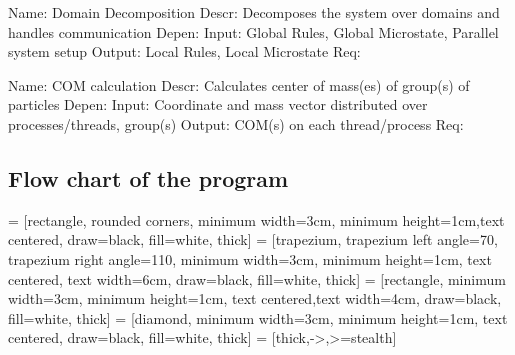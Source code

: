 Name:    Domain Decomposition
Descr:   Decomposes the system over domains and handles communication
Depen:  
Input:   Global Rules, Global Microstate, Parallel system setup
Output:  Local Rules, Local Microstate
Req:    
 
Name:  COM calculation
Descr:  Calculates center of mass(es) of group(s) of particles
Depen:
Input:  Coordinate and mass vector distributed over processes/threads, group(s)
Output: COM(s) on each thread/process
Req:

\subsection{Flow chart of the program}
 = [rectangle, rounded corners, minimum width=3cm, minimum height=1cm,text centered, draw=black, fill=white, thick]
 = [trapezium, trapezium left angle=70, trapezium right angle=110, minimum width=3cm, minimum height=1cm, text centered, text width=6cm, draw=black, fill=white, thick]
 = [rectangle, minimum width=3cm, minimum height=1cm, text centered,text width=4cm, draw=black, fill=white, thick]
 = [diamond, minimum width=3cm, minimum height=1cm, text centered, draw=black, fill=white, thick]
 = [thick,->,>=stealth]
